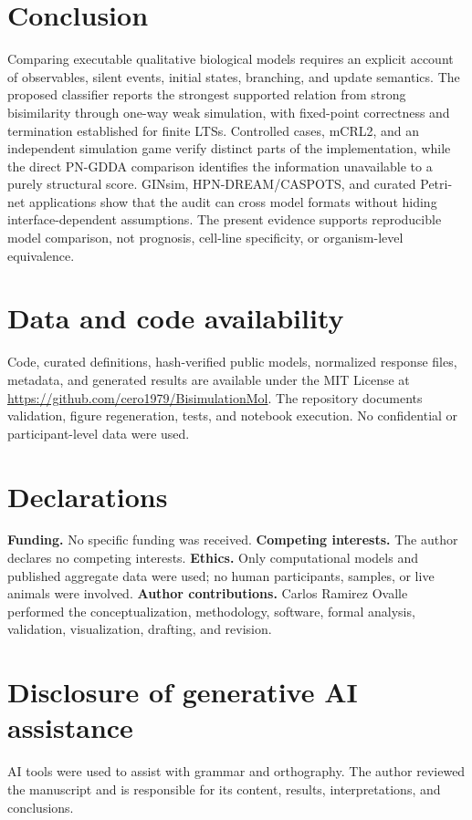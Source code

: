 \documentclass{ws-jbcb}
\numberwithin{equation}{section}
\begin{document}
\section{Conclusion}\label{sec:conclusion}

Comparing executable qualitative biological models requires an explicit account
of observables, silent events, initial states, branching, and update semantics.
The proposed classifier reports the strongest supported relation from strong
bisimilarity through one-way weak simulation, with fixed-point correctness and
termination established for finite LTSs. Controlled cases, mCRL2, and an
independent simulation game verify distinct parts of the implementation, while
the direct PN-GDDA comparison identifies the information unavailable to a purely
structural score. GINsim, HPN-DREAM/CASPOTS, and curated Petri-net applications
show that the audit can cross model formats without hiding interface-dependent
assumptions. The present evidence supports reproducible model comparison, not
prognosis, cell-line specificity, or organism-level equivalence.

\section*{Data and code availability}

Code, curated definitions, hash-verified public models, normalized response
files, metadata, and generated results are available under the MIT License at
\url{https://github.com/cero1979/BisimulationMol}. The repository documents
validation, figure regeneration, tests, and notebook execution. No confidential
or participant-level data were used.

\section*{Declarations}

\noindent\textbf{Funding.} No specific funding was received.
\textbf{Competing interests.} The author declares no competing interests.
\textbf{Ethics.} Only computational models and published aggregate data were
used; no human participants, samples, or live animals were involved.
\textbf{Author contributions.} Carlos Ramirez Ovalle performed the
conceptualization, methodology, software, formal analysis, validation,
visualization, drafting, and revision.

\section*{Disclosure of generative AI assistance}

AI tools were used to assist with grammar and orthography. The author reviewed the manuscript and
is responsible for its content, results, interpretations, and conclusions.



\end{document}
